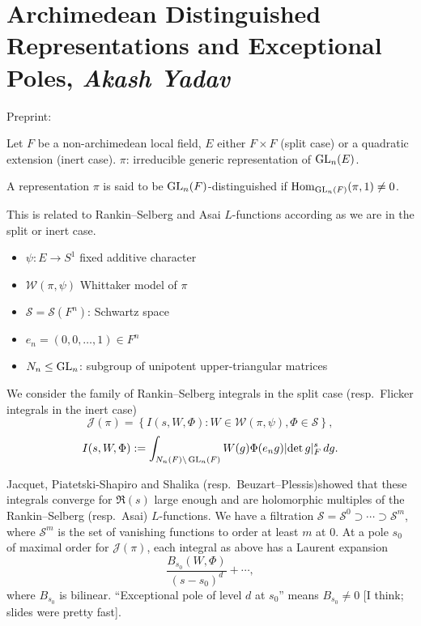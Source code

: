 \documentclass[reqno]{amsart} 
\begin{document}
\section{Archimedean Distinguished Representations and Exceptional Poles, \textnormal{\emph{
      Akash Yadav}}}

Preprint: \cite{2024arXiv2401.09063}

Let $F$ be a non-archimedean local field, $E$ either $F \times F$ (split case) or a quadratic extension (inert case).  $\pi$: irreducible generic representation of $\operatorname{GL}_n(E)$.

\begin{definition}
  A representation $\pi$ is said to be $\operatorname{GL}_n(F)$-distinguished if $\operatorname{Hom}_{\operatorname{GL}_n(F)}(\pi,1) \neq 0$.
\end{definition}
This is related to Rankin--Selberg and Asai $L$-functions according as we are in the split or inert case.

\begin{itemize}
\item $\psi : E \rightarrow S^1$ fixed additive character
\item $\mathcal{W}(\pi, \psi)$ Whittaker model of $\pi$
\item $\mathcal{S} = \mathcal{S}(F^n)$: Schwartz space
\item $e_n =(0, 0, \dotsc, 1) \in F^n$
\item $N_n \leq \operatorname{GL}_n$: subgroup of unipotent upper-triangular matrices
\end{itemize}
We consider the family of Rankin--Selberg integrals in the split case (resp.\ Flicker integrals in the inert case)
\begin{equation*}
  \mathcal{J}(\pi) = \left\{ I(s, W, \Phi) : W \in \mathcal{W}(\pi, \psi), \Phi \in \mathcal{S} \right\},
\end{equation*}
\begin{equation*}
  I(s, W, \Phi) := \int_{N_n(F) \backslash \operatorname{GL}_n(F)} W(g)
  \Phi(e_n g)
  \lvert \det g \rvert^s_F \, d g.
\end{equation*}

Jacquet, Piatetski-Shapiro and Shalika (resp.\ Beuzart--Plessis)showed that these integrals converge for $\Re(s)$ large enough and are holomorphic multiples of the Rankin--Selberg (resp.\ Asai) $L$-functions.  We have a filtration $\mathcal{S} = \mathcal{S}^0 \supset \dotsb \supset \mathcal{S} ^m$, where $\mathcal{S}^m$ is the set of vanishing functions to order at least $m$ at $0$.  At a pole $s_0$ of maximal order for $\mathcal{J}(\pi)$, each integral as above has a Laurent expansion
\begin{equation}\label{eq:cnojsuo68y}
  \frac{B_{s_0}(W, \Phi)}{(s - s_0)^d} + \dotsb,
\end{equation}
where $B_{s_0}$ is bilinear.  ``Exceptional pole of level $d$ at $s_0$'' means $B_{s_0} \neq 0$ [I think; slides were pretty fast].
\end{document}
